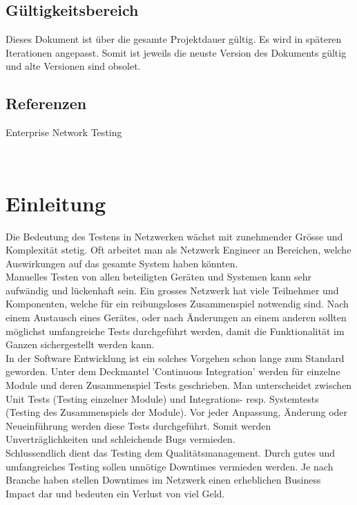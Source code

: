 \documentclass[a4,12pt]{scrartcl}
\begin{document}
\subsection{Gültigkeitsbereich}
Dieses Dokument ist über die gesamte Projektdauer gültig. Es wird in späteren Iterationen angepasst. Somit ist jeweils die neuste Version des Dokuments gültig und alte Versionen sind obsolet.
\subsection{Referenzen}
\begin{description}
\item[Enterprise Network Testing] \hfill \\
 \newline
{}
\end{description}
\newpage
\section{Einleitung}
Die Bedeutung des Testens in Netzwerken wächst mit zunehmender Grösse und Komplexität stetig. Oft arbeitet man als Netzwerk Engineer an Bereichen, welche Auswirkungen auf das gesamte System haben könnten.\\

\noindent Manuelles Testen von allen beteiligten Geräten und Systemen kann sehr aufwändig und lückenhaft sein. Ein grosses Netzwerk hat viele Teilnehmer und Komponenten, welche für ein reibungsloses Zusammenspiel notwendig sind. Nach einem Austausch eines Gerätes, oder nach Änderungen an einem anderen sollten möglichst umfangreiche Tests durchgeführt werden, damit die Funktionalität im Ganzen sichergestellt werden kann.\\

\noindent In der Software Entwicklung ist ein solches Vorgehen schon lange zum Standard geworden. Unter dem Deckmantel 'Continuous Integration' werden für einzelne Module und deren Zusammenspiel Tests geschrieben. Man unterscheidet zwischen Unit Tests (Testing einzelner Module) und Integrations- resp. Systemtests (Testing des Zusammenspiels der Module). Vor jeder Anpassung, Änderung oder Neueinführung werden diese Tests durchgeführt. Somit werden Unverträglichkeiten und schleichende Bugs vermieden.\\

\noindent Schlussendlich dient das Testing dem Qualitätsmanagement. Durch gutes und umfangreiches Testing sollen unnötige Downtimes vermieden werden. Je nach Branche haben stellen Downtimes im Netzwerk einen erheblichen Business Impact dar und bedeuten ein Verlust von viel Geld.\\
\end{document}

